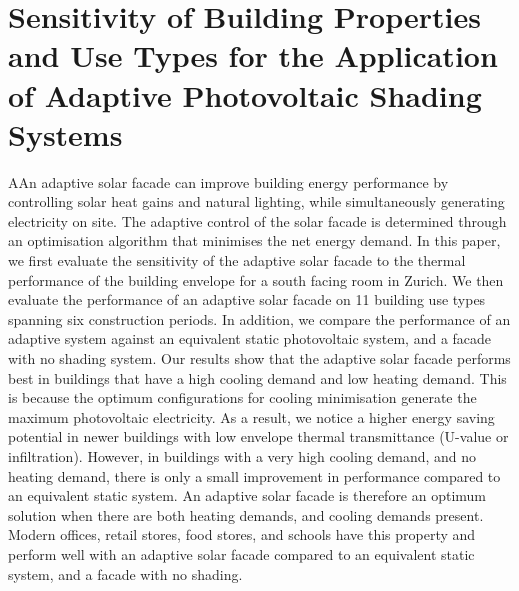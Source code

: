 
\chapter{Sensitivity of Building Properties and Use Types for the Application of Adaptive Photovoltaic Shading Systems}
\label{ch:asfArchetype}

\graphicspath{{chapters/ch3Archetype//Images/}}

\begin{chapterabstract}
AAn adaptive solar facade can improve building energy performance by controlling solar heat gains and natural lighting, while simultaneously generating electricity on site. The adaptive control of the solar facade is determined through an optimisation algorithm that minimises the net energy demand. In this paper, we first evaluate the sensitivity of the adaptive solar facade to the thermal performance of the building envelope for a south facing room in Zurich. We then evaluate the performance of an adaptive solar facade on 11 building use types spanning six construction periods. In addition, we compare the performance of an adaptive system against an equivalent static photovoltaic system, and a facade with no shading system. Our results show that the adaptive solar facade performs best in buildings that have a high cooling demand and low heating demand. This is because the optimum configurations for cooling minimisation generate the maximum photovoltaic electricity. As a result, we notice a higher energy saving potential in newer buildings with low envelope thermal transmittance (U-value or infiltration). However, in buildings with a very high cooling demand, and no heating demand, there is only a small improvement in performance compared to an equivalent static system. An adaptive solar facade is therefore an optimum solution when there are both heating demands, and cooling demands present. Modern offices, retail stores, food stores, and schools have this property and perform well with an adaptive solar facade compared to an equivalent static system, and a facade with no shading.
\end{chapterabstract}



